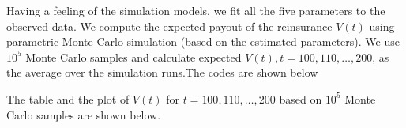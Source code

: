 \documentclass[11pt,]{article}
\newenvironment{Shaded}{\begin{snugshade}}{\end{snugshade}}
\newcommand{\CommentTok}[1]{\textcolor[rgb]{0.56,0.35,0.01}{\textit{#1}}}
\newcommand{\ControlFlowTok}[1]{\textcolor[rgb]{0.13,0.29,0.53}{\textbf{#1}}}
\newcommand{\DecValTok}[1]{\textcolor[rgb]{0.00,0.00,0.81}{#1}}
\newcommand{\KeywordTok}[1]{\textcolor[rgb]{0.13,0.29,0.53}{\textbf{#1}}}
\newcommand{\NormalTok}[1]{#1}
\newcommand{\OperatorTok}[1]{\textcolor[rgb]{0.81,0.36,0.00}{\textbf{#1}}}
\newcommand{\StringTok}[1]{\textcolor[rgb]{0.31,0.60,0.02}{#1}}
\begin{document}
Having a feeling of the simulation models, we fit all the five
parameters to the observed data. We compute the expected payout of the
reinsurance \(V(t)\) using parametric Monte Carlo simulation (based on
the estimated parameters). We use \(10^5\) Monte Carlo samples and
calculate expected \(V(t), t=100,110,…,200\), as the average over the
simulation runs.The codes are shown below

\begin{Shaded}
\end{Shaded}

The table and the plot of \(V(t)\) for \(t=100,110,…,200\) based on
\(10^5\) Monte Carlo samples are shown below.
\end{document}
